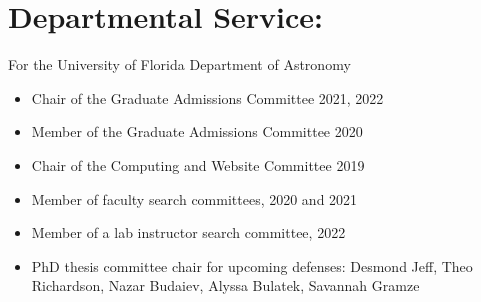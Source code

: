\begin{minipage}{\textwidth}
\section*{Departmental Service:}
\vspace{-10pt}
For the University of Florida Department of Astronomy
\begin{itemize}
\itemsep-3pt
\item Chair of the Graduate Admissions Committee 2021, 2022
\item Member of the Graduate Admissions Committee 2020
\item Chair of the Computing and Website Committee 2019
\item Member of faculty search committees, 2020 and 2021
\item Member of a lab instructor search committee, 2022
\item PhD thesis committee chair for upcoming defenses: Desmond Jeff, Theo Richardson, Nazar Budaiev, Alyssa Bulatek, Savannah Gramze
\end{itemize}
\end{minipage}
\vspace{4mm}
